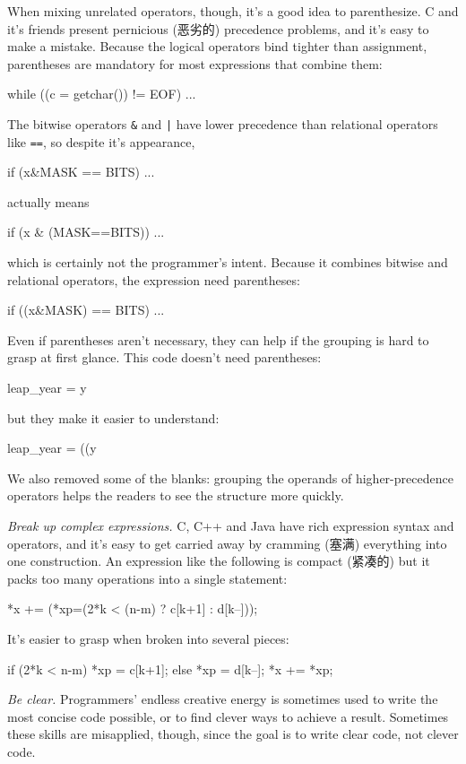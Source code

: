 When mixing unrelated operators, though, it's a good idea to parenthesize. C
and it's friends present pernicious (恶劣的) precedence problems, and it's
easy to make a mistake. Because the logical operators bind tighter than
assignment, parentheses are mandatory for most expressions that combine them:
\begin{wellcode}
    while ((c = getchar()) != EOF)
        ...
\end{wellcode}
The bitwise operators \verb"&" and \verb"|" have lower precedence than
relational operators like \verb"==", so despite it's appearance,
\begin{badcode}
    if (x&MASK == BITS)
        ...
\end{badcode}
actually means
\begin{badcode}
    if (x & (MASK==BITS))
        ...
\end{badcode}
which is certainly not the programmer's intent. Because it combines bitwise
and relational operators, the expression need parentheses:
\begin{wellcode}
    if ((x&MASK) == BITS)
        ...
\end{wellcode}
Even if parentheses aren't necessary, they can help if the grouping is hard
to grasp at first glance. This code doesn't need parentheses:
\begin{badcode}
    leap_year = y %
\end{badcode}
but they make it easier to understand:
\begin{wellcode}
    leap_year = ((y%
\end{wellcode}
We also removed some of the blanks: grouping the operands of
higher-precedence operators helps the readers to see the structure more
quickly.

\emph{Break up complex expressions.} C, C++ and Java have rich expression
syntax and operators, and it's easy to get carried away by cramming (塞满)
everything into one construction. An expression like the following is
compact (紧凑的) but it packs too many operations into a single statement:
\begin{badcode}
    *x += (*xp=(2*k < (n-m) ? c[k+1] : d[k--]));
\end{badcode}
It's easier to grasp when broken into several pieces:
\begin{wellcode}
    if (2*k < n-m)
        *xp = c[k+1];
    else 
        *xp = d[k--];
    *x += *xp;
\end{wellcode}
\emph{Be clear.} Programmers' endless creative energy is sometimes used to
write the most concise code possible, or to find clever ways to achieve a
result. Sometimes these skills are misapplied, though, since the goal is to
write clear code, not clever code.

